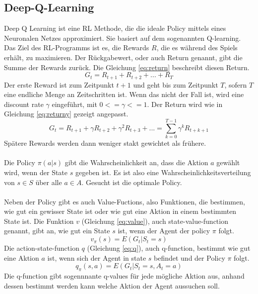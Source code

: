 \subsection{Deep-Q-Learning}
Deep Q Learning ist eine RL Methode, die die ideale Policy mittels eines Neuronalen Netzes approximiert. Sie basiert auf dem sogenannten Q-learning.
\\
Das Ziel des RL-Programms ist es, die Rewards $R$, die es während des Spiels erhält, zu maximieren. Der Rückgabewert, oder auch Return genannt, gibt die Summe der Rewards zurück. Die Gleichung \ref{eq:return} beschreibt diesen Return.
\begin{equation}\label{eq:return}
	G_t = R_{t+1}+R_{t+2}+...+R_T
\end{equation}
Der erste Reward ist zum Zeitpunkt $t+1$ und geht bis zum Zeitpunkt $T$, sofern $T$ eine endliche Menge an Zeitschritten ist.
Wenn das nicht der Fall ist, wird eine discount rate $\gamma{}$ eingeführt, mit $0<=\gamma{}<=1$.
Der Return wird wie in Gleichung \ref{eq:returny} gezeigt angepasst.
\begin{equation}\label{eq:returny}
	G_t = R_{t+1}+\gamma{}R_{t+2}+\gamma{}^2R_{t+3}+... = \sum_{k=0}^{T-1} \gamma{}^kR_{t+k+1}
\end{equation}
Spätere Rewards werden dann weniger stakt gewichtet als frühere.
\\\\
Die Policy $\pi{}(a|s)$ gibt die Wahrscheinlichkeit an, dass die Aktion $a$ gewählt wird, wenn der State $s$ gegeben ist. Es ist also eine Wahrscheinlichkeitsverteilung von $s \in S$ über alle $a \in A$. Gesucht ist die optimale Policy.
\\\\
Neben der Policy gibt es auch Value-Fuctions, also Funktionen, die bestimmen, wie gut ein gewisser State ist oder wie gut eine Aktion in einem bestimmten State ist.
Die Funktion $v$ (Gleichung \ref{eq:value}), auch state-value-function genannt, gibt an, wie gut ein State $s$ ist, wenn der Agent der policy $\pi$ folgt. 
\begin{equation}\label{eq:value}
	v_\pi(s) = E(G_t|S_t=s)
\end{equation}
Die action-state-function $q$ (Gleichung \ref{eq:q}), auch q-function, bestimmt wie gut eine Aktion $a$ ist, wenn sich der Agent in state $s$ befindet und der Policy $\pi$ folgt.
\begin{equation}\label{eq:q}
	q_\pi(s,a) = E(G_t|S_t=s, A_t=a)
\end{equation}
Die q-function gibt sogennnante q-values für jede mögliche Aktion aus, anhand dessen bestimmt werden kann welche Aktion der Agent aussuchen soll. 
